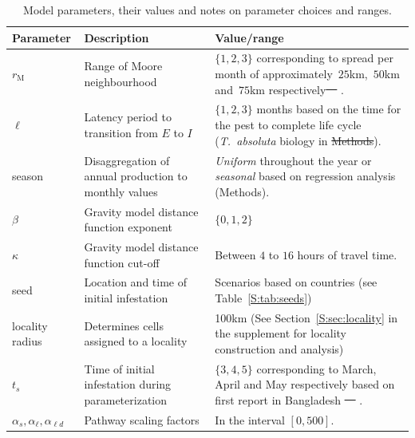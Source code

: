 \documentclass[11pt]{article}
\newcommand{\tuta}{\emph{T.~absoluta}}
\newcommand{\infest}{\rho}
\newcommand{\suitable}{\epsilon}
\newcommand{\asd}{\alpha_s}
\newcommand{\afm}{\alpha_{\ell}}
\newcommand{\ald}{\alpha_{\ell d}}
\newcommand{\mooreRange}{r_\mathrm{M}}
\theoremstyle{definition}
\providecommand{\DIFaddtex}[1]{{\protect\color{blue}\uwave{#1}}} %
\providecommand{\DIFdeltex}[1]{{\protect\color{red}\sout{#1}}}                      %
\providecommand{\DIFaddFL}[1]{\DIFadd{#1}} %
\providecommand{\DIFdelFL}[1]{\DIFdel{#1}} %
\providecommand{\DIFaddbeginFL}{} %
\providecommand{\DIFaddendFL}{} %
\providecommand{\DIFdelbeginFL}{} %
\providecommand{\DIFdelendFL}{} %
\providecommand{\DIFadd}[1]{\texorpdfstring{\DIFaddtex{#1}}{#1}} %
\providecommand{\DIFdel}[1]{\texorpdfstring{\DIFdeltex{#1}}{}} %
\newcommand{\DIFscaledelfig}{0.5}
\newlength{\DIFdelgraphicswidth} %
\newlength{\DIFdelgraphicsheight} %
\newcommand{\DIFaddincludegraphics}[2][]{{\color{blue}\fbox{\DIFOincludegraphics[#1]{#2}}}} %
\newcommand{\DIFdelincludegraphics}[2][]{%
\sbox{\DIFdelgraphicsbox}{\DIFOincludegraphics[#1]{#2}}%
\settoboxwidth{\DIFdelgraphicswidth}{\DIFdelgraphicsbox} %
\settoboxtotalheight{\DIFdelgraphicsheight}{\DIFdelgraphicsbox} %
\scalebox{\DIFscaledelfig}{%
\parbox[b]{\DIFdelgraphicswidth}{\usebox{\DIFdelgraphicsbox}\\[-\baselineskip] \rule{\DIFdelgraphicswidth}{0em}}\llap{\resizebox{\DIFdelgraphicswidth}{\DIFdelgraphicsheight}{%
\setlength{\unitlength}{\DIFdelgraphicswidth}%
\begin{picture}(1,1)%
\thicklines\linethickness{2pt} %
{\color[rgb]{1,0,0}\put(0,0){\framebox(1,1){}}}%
{\color[rgb]{1,0,0}\put(0,0){\line( 1,1){1}}}%
{\color[rgb]{1,0,0}\put(0,1){\line(1,-1){1}}}%
\end{picture}%
}\hspace*{3pt}}} %
} %
\DeclareRobustCommand{\DIFaddbeginFL}{\DIFOaddbeginFL \let\includegraphics\DIFaddincludegraphics} %
\DeclareRobustCommand{\DIFaddendFL}{\DIFOaddendFL \let\includegraphics\DIFOincludegraphics} %
\DeclareRobustCommand{\DIFdelbeginFL}{\DIFOdelbeginFL \let\includegraphics\DIFdelincludegraphics} %
\DeclareRobustCommand{\DIFdelendFL}{\DIFOaddendFL \let\includegraphics\DIFOincludegraphics} %
\begin{document}
\begin{table}[t]
\caption{Model parameters, their values and notes on parameter choices and
ranges.\label{tab:param}}
    \centering
	\small
{} %
    \begin{tabular}{p{}p{}p{}}
		\hline		
		Parameter & Description & Value/range \\
\hline		
\hline
$\mooreRange$ & Range of Moore neighbourhood & $\{1,2,3\}$ corresponding to
spread per month of 
approximately~$25$km,~$50$km and~$75$km
respectively\DIFdelbeginFL \DIFdelFL{~\mbox{%
\cite{guimapi2016modeling,martins2018assessing}}\hspace{0pt}%
}\DIFdelendFL . \\
$\ell$ & Latency period to transition from $E$ to $I$ & $\{1,2,3\}$ months
based on the time for the pest to complete life cycle (\tuta{} biology in
\DIFdelbeginFL \DIFdelFL{Methods}\DIFdelendFL \DIFaddbeginFL \DIFaddFL{Section~\ref{S:sec:biology}}\DIFaddendFL ). \\
season & Disaggregation of annual production to monthly values
& \emph{Uniform} throughout the year or \emph{seasonal} based on regression
analysis (Methods). \\
$\beta$ & Gravity model distance function exponent & $\{0,1,2\}$ \\
$\kappa$ & Gravity model distance function cut-off & Between $4$ to $16$ hours
of travel time. \\
seed & Location and time of initial infestation & Scenarios based on
countries (see Table~\ref{S:tab:seeds})\\
locality radius & Determines cells assigned to a locality & 100km (See
Section~\ref{S:sec:locality} in the supplement for locality construction
and analysis) \\\hline
$t_s$ & Time of initial infestation during parameterization & $\{3,4,5\}$ corresponding
to March, April and May respectively based on first report in
Bangladesh \DIFdelbeginFL \DIFdelFL{~\mbox{%
\cite{hossain2016first}}\hspace{0pt}%
}\DIFdelendFL \DIFaddbeginFL \DIFaddFL{(Table~\ref{S:tab:bgdData})}\DIFaddendFL . \\
$\asd,\afm,\ald$ & Pathway scaling factors & In the interval $[0,500]$.\\
\hline
\end{tabular}
\end{table}
\end{document}
